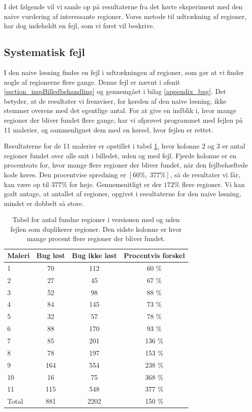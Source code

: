 {
{\sffamily I det følgende vil vi samle op på resultaterne fra det kørte
eksperiment med den naive vurdering af interessante regioner. Vores
metode til udtrækning af regioner, har dog indeholdt en fejl, som vi
først vil beskrive.
}

\subsection{Systematisk fejl\label{program_bug}}
I den naive løsning findes en fejl i udtrækningen af regioner, som gør
at vi finder nogle af regionerne flere gange. Denne fejl er nævnt i
afsnit \ref{section_impBilledbehandling} og gennemgået i bilag
\ref{appendix_bug}. Det betyder, at de resultater vi fremviser, for
kørslen af den naive løsning, ikke stemmer overens med det egentlige
antal. For at give en indblik i, hvor mange regioner der bliver fundet
flere gange, har vi afprøvet programmet med fejlen på 11 malerier, og
sammenlignet dem med en kørsel, hvor fejlen er rettet.

Resultaterne for de 11 malerier er opstillet i tabel \ref{bug_tabel},
hvor kolonne 2 og 3 er antal regioner fundet over alle snit i billedet,
uden og med fejl.  Fjerde kolonne er en procentsats for, hvor mange
flere regioner der bliver fundet, når den fejlbehæftede kode køres. Den
procentvise spredning er $[60 \%,~377 \%]$, så de resultater vi får, kan
være op til $377\%$ for høje.  Gennemsnitligt er der $172 \%$ flere
regioner. Vi kan godt antage, at antallet af regioner, opgivet i
resultaterne for den naive løsning, mindst er dobbelt så store.

\begin{table}[!h]
    \centering
    \begin{tabular}{|l|c|c|c|}
        \hline
  Maleri  & Bug løst 		& Bug ikke løst		& Procentvis forskel\\\hline
        1   & 70 			& 112 				& 60 \% \\
        2   & 27 			& 45 				& 67 \% \\
        3	& 52 			& 98 				& 88 \% \\
        4   & 84 			& 145 				& 73 \% \\
        5	& 32 			& 57 				& 78 \% \\
        6   & 88 			& 170 				& 93 \% \\
        7   & 85 			& 201 				& 136 \% \\
        8   & 78 			& 197 				& 153 \% \\
        9   & 164 			& 554 				& 238 \% \\
        10	& 16 			& 75 				& 368 \% \\
        11	& 115 			& 548 				& 377 \% \\\hline
	Total	& 881			& 2202				& 150 \% \\\hline
	  \end{tabular}
    \caption[]{Tabel for antal fundne regioner i versionen med og uden
    fejlen som duplikerer regioner. Den sidste kolonne er hvor mange
    procent flere regioner der bliver fundet.}
    \label{bug_tabel}
\end{table}

}
